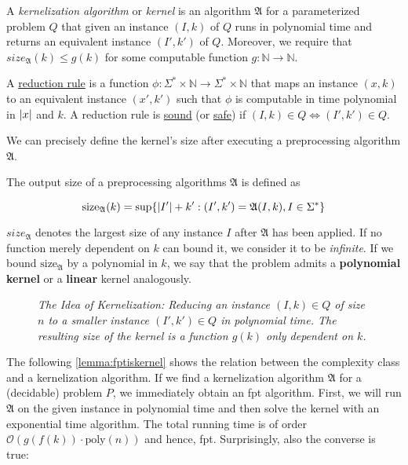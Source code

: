 \begin{definition}
A \textit{kernelization algorithm} or \textit{kernel} is an algorithm $\mathfrak{A}$ for a parameterized problem $Q$ that given an instance $(I,k)$ of $Q$ runs in polynomial time and returns an equivalent instance $(I', k')$ of $Q$. 
Moreover, we require that $size_{\mathfrak{A}}(k) \leq g(k)$ for some computable function $g:\mathbb{N} \rightarrow \mathbb{N}$.

A \underline{reduction rule} is a function $\phi:\Sigma^* \times \mathbb{N} \rightarrow \Sigma^* \times \mathbb{N}$ that maps an instance $(x,k)$ to an equivalent instance $(x',k')$ such that $\phi$ is computable in time polynomial in $\abs{x}$ and $k$.
A reduction rule is \underline{sound} (or \underline{safe}) if $(I, k) \in Q \Leftrightarrow (I',k') \in Q$.
\end{definition}

We can precisely define the kernel's size after executing a preprocessing algorithm $\mathfrak{A}$.

\begin{definition} The output size of a preprocessing algorithms $\mathfrak{A}$ is defined as 

    \[\mathrm{size}_{\mathfrak{A}}(k) = \sup\{\abs{I'} + k': (I',k')= \mathfrak{A}(I,k), I \in \Sigma^* \} \]
\end{definition}


$size_{\mathfrak{A}}$ denotes the largest size of any instance $I$ after $\mathfrak{A}$ has been applied.
If no function merely dependent on $k$ can bound it, we consider it to be \emph{infinite}.
If we bound $\mathrm{size}_{\mathfrak{A}}$ by a polynomial in $k$, we say that the problem admits a \textbf{polynomial kernel} or a \textbf{linear} kernel analogously.

\begin{figure}
    \centering
    
    \caption[Idea of kernelization]{\textit{The Idea of Kernelization: Reducing an instance $(I,k) \in Q$ of size $n$ to a smaller instance $(I', k') \in Q$ in polynomial time. 
    The resulting size of the kernel is a function $g(k)$ only dependent on $k$.}
    }
    \label{fig:kernelization}
\end{figure}
The following \cref{lemma:fptiskernel} shows the relation between the complexity class \FPT and a kernelization algorithm. 
If we find a kernelization algorithm $\mathfrak{A}$ for a (decidable) problem $P$, we immediately obtain an fpt algorithm.
First, we will run $\mathfrak{A}$ on the given instance in polynomial time and then solve the kernel with an exponential time algorithm.
The total running time is of order $\mathcal{O}(g(f(k)) \cdot \mathrm{poly}(n))$ and hence, fpt.
Surprisingly, also the converse is true:

